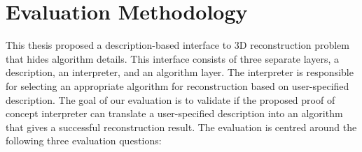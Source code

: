 
\section{Evaluation Methodology}
\label{sec:interp_eval_methodology}

This thesis proposed a description-based interface to 3D reconstruction problem that hides algorithm details. This interface consists of three separate layers, a description, an interpreter, and an algorithm layer. The interpreter is responsible for selecting an appropriate algorithm for reconstruction based on user-specified description. The goal of our evaluation is to validate if the proposed proof of concept interpreter can translate a user-specified description into an algorithm that gives a successful reconstruction result. The evaluation is centred around the following three evaluation questions:



